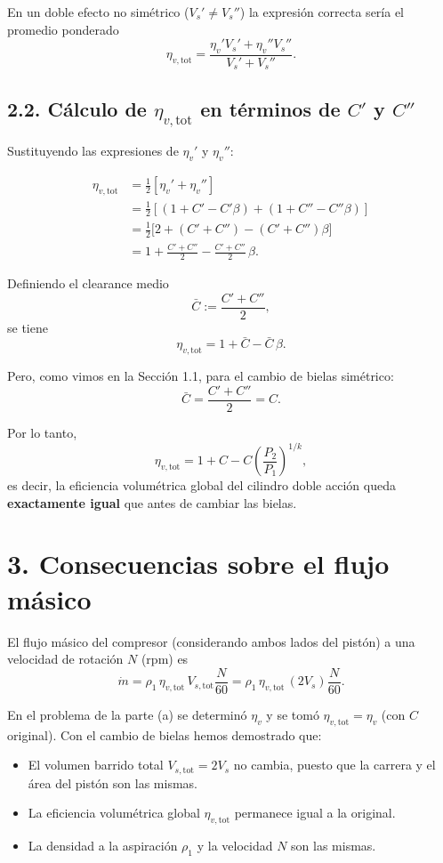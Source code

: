 \documentclass[11pt,a4paper]{article}
\begin{document}
En un doble efecto no simétrico ($V_s' \neq V_s''$) la expresión correcta sería
el promedio ponderado
\[
\eta_{v,\text{tot}} =
\frac{\eta_v' V_s' + \eta_v'' V_s''}{V_s' + V_s''}.
\]

\subsection*{2.2. Cálculo de $\eta_{v,\text{tot}}$ en términos de $C'$ y $C''$}

Sustituyendo las expresiones de $\eta_v'$ y $\eta_v''$:

\begin{align*}
\eta_{v,\text{tot}}
&= \frac{1}{2}\left[\eta_v' + \eta_v''\right] \\
&= \frac{1}{2}\left[
(1 + C' - C'\beta) + (1 + C'' - C''\beta)
\right]\\
&= \frac{1}{2}\big[2 + (C' + C'') - (C' + C'')\beta\big]\\[4pt]
&= 1 + \frac{C' + C''}{2} - \frac{C' + C''}{2}\,\beta.
\end{align*}

Definiendo el clearance medio
\[
\bar C := \frac{C' + C''}{2},
\]
se tiene
\[
\eta_{v,\text{tot}} = 1 + \bar C - \bar C\,\beta.
\]

Pero, como vimos en la Sección 1.1, para el cambio de bielas simétrico:
\[
\bar C = \frac{C' + C''}{2} = C.
\]

Por lo tanto,
\[
\boxed{
\eta_{v,\text{tot}} = 1 + C - C\left(\frac{P_2}{P_1}\right)^{1/k},
}
\]
es decir, la eficiencia volumétrica global del cilindro doble acción queda
\textbf{exactamente igual} que antes de cambiar las bielas.

\section*{3. Consecuencias sobre el flujo másico}

El flujo másico del compresor (considerando ambos lados del pistón) a una
velocidad de rotación $N$ (rpm) es
\[
\dot m = \rho_1\,\eta_{v,\text{tot}}\, V_{s,\text{tot}} \frac{N}{60}
       = \rho_1\,\eta_{v,\text{tot}}\, (2 V_s)\frac{N}{60}.
\]

En el problema de la parte (a) se determinó $\eta_v$ y se tomó
\(\eta_{v,\text{tot}} = \eta_v\) (con $C$ original). Con el cambio de bielas
hemos demostrado que:

\begin{itemize}
  \item El volumen barrido total $V_{s,\text{tot}} = 2V_s$ no cambia, puesto que
        la carrera y el área del pistón son las mismas.
  \item La eficiencia volumétrica global $\eta_{v,\text{tot}}$ permanece igual a
        la original.
  \item La densidad a la aspiración $\rho_1$ y la velocidad $N$ son las mismas.
\end{itemize}
\end{document}
